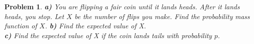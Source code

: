 \documentclass[a4paper,12pt]{article}
\theoremstyle{perfect}
\newtheorem{prb}{Problem}
\begin{document}
\begin{prb}
\textbf{a)} You are flipping a fair coin until it lands heads. After it lands heads, you stop. Let $X$ be the number of flips you make. Find the probability mass function of $X$. 
\newline
\textbf{b)} Find the expected value of X.  \\
\textbf{c)} Find the expected value of X if the coin lands tails with probability $p$.
\end{prb}
\end{document}
